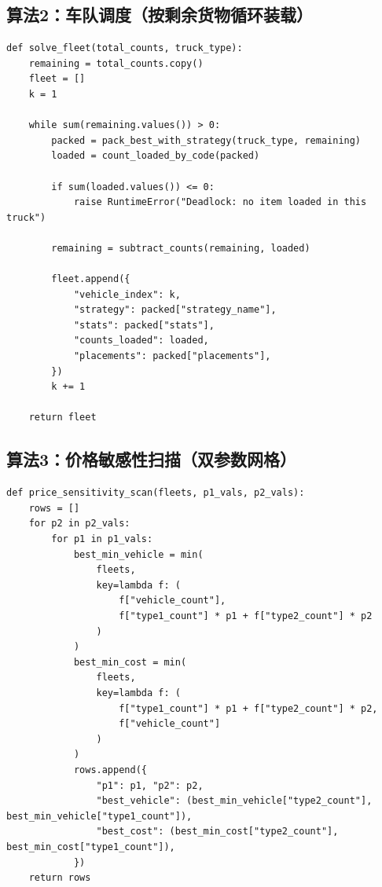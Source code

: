 \documentclass{MMCStyle}
\begin{document}
\subsection{算法2：车队调度（按剩余货物循环装载）}
\begin{lstlisting}[style=pycolor,caption={车队调度主循环（节选）}]
def solve_fleet(total_counts, truck_type):
    remaining = total_counts.copy()
    fleet = []
    k = 1

    while sum(remaining.values()) > 0:
        packed = pack_best_with_strategy(truck_type, remaining)
        loaded = count_loaded_by_code(packed)

        if sum(loaded.values()) <= 0:
            raise RuntimeError("Deadlock: no item loaded in this truck")

        remaining = subtract_counts(remaining, loaded)

        fleet.append({
            "vehicle_index": k,
            "strategy": packed["strategy_name"],
            "stats": packed["stats"],
            "counts_loaded": loaded,
            "placements": packed["placements"],
        })
        k += 1

    return fleet
\end{lstlisting}

\subsection{算法3：价格敏感性扫描（双参数网格）}
\begin{lstlisting}[style=pycolor,caption={价格敏感性分析（节选）}]
def price_sensitivity_scan(fleets, p1_vals, p2_vals):
    rows = []
    for p2 in p2_vals:
        for p1 in p1_vals:
            best_min_vehicle = min(
                fleets,
                key=lambda f: (
                    f["vehicle_count"],
                    f["type1_count"] * p1 + f["type2_count"] * p2
                )
            )
            best_min_cost = min(
                fleets,
                key=lambda f: (
                    f["type1_count"] * p1 + f["type2_count"] * p2,
                    f["vehicle_count"]
                )
            )
            rows.append({
                "p1": p1, "p2": p2,
                "best_vehicle": (best_min_vehicle["type2_count"], best_min_vehicle["type1_count"]),
                "best_cost": (best_min_cost["type2_count"], best_min_cost["type1_count"]),
            })
    return rows
\end{lstlisting}
\end{document}
